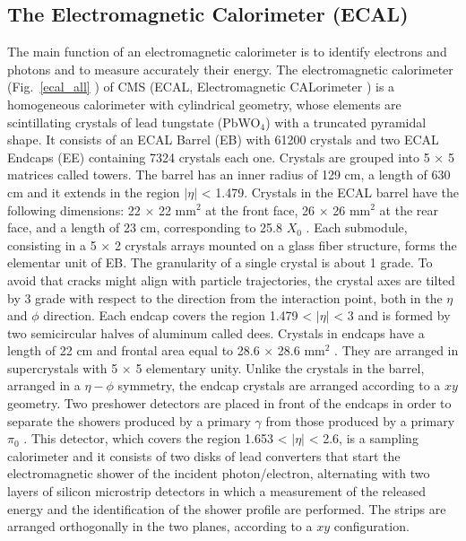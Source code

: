 \subsection*{The Electromagnetic Calorimeter (ECAL)}
The main function of an electromagnetic calorimeter is to identify electrons and photons
and to measure accurately their energy. The electromagnetic calorimeter (Fig.~\ref{ecal_all} ) of
CMS (ECAL, Electromagnetic CALorimeter )  is a homogeneous calorimeter with
cylindrical geometry, whose elements are scintillating crystals of lead tungstate (PbWO$_4$)
with a truncated pyramidal shape. It consists of an ECAL Barrel (EB) with 61200 crystals
and two ECAL Endcaps (EE) containing 7324 crystals each one.
Crystals are grouped into 5 × 5 matrices called towers. The barrel has an inner radius of
129 cm, a length of 630 cm and it extends in the region $|\eta|$ < 1.479. Crystals in the ECAL
barrel have the following dimensions: 22 × 22 mm$^2$ at the front face, 26 × 26 mm$^2$ at the
rear face, and a length of 23 cm, corresponding to 25.8 $X_0$ . Each submodule, consisting
in a 5 × 2 crystals arrays mounted on a glass fiber structure, forms the elementar unit of
EB. The granularity of a single crystal is about 1 grade. To avoid that cracks might align with
particle trajectories, the crystal axes are tilted by 3 grade with respect to the direction from
the interaction point, both in the $\eta$ and $\phi$ direction.
Each endcap covers the region 1.479 < $|\eta|$ < 3 and is formed by two semicircular halves
of aluminum called dees. Crystals in endcaps have a length of 22 cm and frontal area
equal to 28.6 × 28.6 mm$^2$ . They are arranged in supercrystals with 5 × 5 elementary unity.
Unlike the crystals in the barrel, arranged in a $\eta - \phi $ symmetry, the endcap crystals are
arranged according to a $xy$ geometry.
Two preshower detectors are placed in front of the endcaps in order to separate the
showers produced by a primary $\gamma$ from those produced by a primary $\pi_0$ . This detector,
which covers the region 1.653 <  $|\eta|$ < 2.6, is a sampling calorimeter and it consists of two
disks of lead converters  that start the electromagnetic
shower of the incident photon/electron, alternating with two layers of silicon microstrip
detectors in which a measurement of the released energy and the identification of the
shower profile are performed. The strips are arranged orthogonally in the two planes,
according to a $xy$ configuration.
